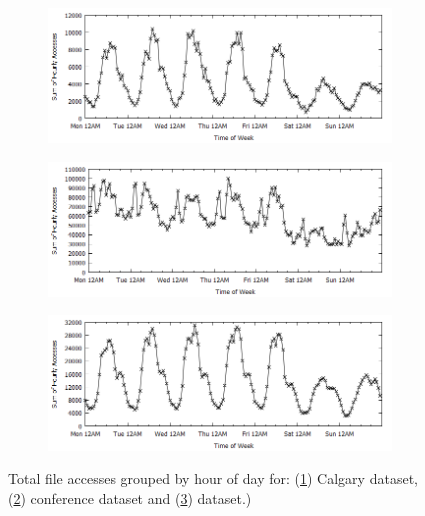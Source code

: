 \documentclass[10pt,conference]{IEEEtran}
\begin{document}
\begin{figure}
    \centering
    \begin{subfigure}{0.45\textwidth}
        \includegraphics[width=\textwidth]{images/calgarytime}
        \caption{}\label{fig:calgary}
    \end{subfigure}
\qquad
    \begin{subfigure}{0.45\textwidth}
        \includegraphics[width=\textwidth]{images/conferencetime}
        \caption{}\label{fig:conference}
    \end{subfigure}

    \begin{subfigure}{0.45\textwidth}
        \includegraphics[width=\textwidth]{images/usasktime}
        \caption{}\label{fig:usask}
    \end{subfigure}
    \caption{Total file accesses grouped by hour of day for: (\ref{fig:calgary}) Calgary dataset, (\ref{fig:conference}) conference dataset and (\ref{fig:usask}) dataset.) }\label{fig:diurnal}
\end{figure}
\end{document}
